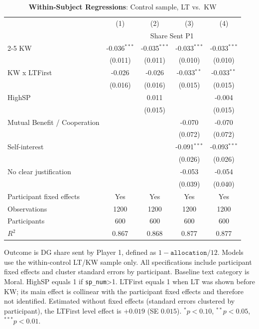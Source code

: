 \begin{table}[!htbp]
\centering
\caption{\textbf{Within-Subject Regressions}: Control sample, LT vs.\ KW}
\label{tab:within_control_regressions}
\begin{tabular}{lcccc}
\toprule
 & (1) & (2) & (3) & (4) \\
 & \multicolumn{4}{c}{Share Sent P1} \\
\cmidrule(lr){2-5}
\midrule
KW & -0.036$^{***}$ & -0.035$^{***}$ & -0.033$^{***}$ & -0.033$^{***}$ \\
 & (0.011) & (0.011) & (0.010) & (0.010) \\
KW x LTFirst & -0.026 & -0.026 & -0.033$^{**}$ & -0.033$^{**}$ \\
 & (0.016) & (0.016) & (0.015) & (0.015) \\
HighSP &  & 0.011 &  & -0.004 \\
 &  & (0.015) &  & (0.015) \\
Mutual Benefit / Cooperation &  &  & -0.070 & -0.070 \\
 &  &  & (0.072) & (0.072) \\
Self-interest &  &  & -0.091$^{***}$ & -0.093$^{***}$ \\
 &  &  & (0.026) & (0.026) \\
No clear justification &  &  & -0.053 & -0.054 \\
 &  &  & (0.039) & (0.040) \\
Participant fixed effects & Yes & Yes & Yes & Yes \\
Observations & 1200 & 1200 & 1200 & 1200 \\
Participants & 600 & 600 & 600 & 600 \\
$R^2$ & 0.867 & 0.868 & 0.877 & 0.877 \\
\bottomrule
\end{tabular}
\begin{flushleft}
\footnotesize Outcome is DG share sent by Player 1, defined as $1-\texttt{allocation}/12$. Models use the within-control LT/KW sample only. All specifications include participant fixed effects and cluster standard errors by participant. Baseline text category is Moral. HighSP equals 1 if \texttt{sp\_num}>1. LTFirst equals 1 when LT was shown before KW\@; its main effect is collinear with the participant fixed effects and therefore not identified. Estimated without fixed effects (standard errors clustered by participant), the LTFirst level effect is $+0.019$ (SE $0.015$). $^{*}p<0.10$, $^{**}p<0.05$, $^{***}p<0.01$.
\end{flushleft}
\end{table}